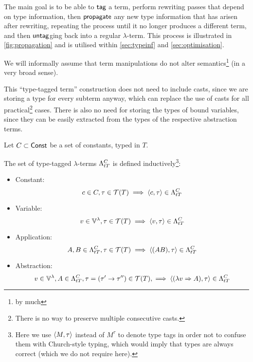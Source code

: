 \documentclass[main.tex]{subfiles}
\begin{document}
The main goal is to be able to $\mcf{tag}$ a term,
perform rewriting passes that depend on type information, then $\mcf{propagate}$
any new type information that has arisen after rewriting, repeating the
process until it no longer produces a different term, and then $\mcf{untag}$ging
back into a regular $\lambda$-term. This process is illustrated in
\cref{fig:propagation} and is utilised within \cref{sec:typeinf} and
\cref{sec:optimisation}.


We will informally assume that term manipulations do not alter semantics\footnote{
    by much} (in a very broad sense).

This ``type-tagged term'' construction  does not need to include casts, since we are storing
a type for every subterm anyway, which can replace the use of casts for all
practical\footnote{
    There is no way to preserve multiple consecutive casts.
} cases. There is also no need for storing the types of bound variables, since
they can be easily extracted from the types of the respective abstraction terms.
\begin{defn}
    Let $C \subset \const$ be a set of constants, typed in $T$.

    The set of type-tagged $\lambda$-terms $\ttlambda{T}{C}$ is defined inductively\footnote{
        Here we use $\ttt{ M}{ \tau }$ instead of $M^\tau$
        to denote type tags in order not to confuse them with Church-style
        typing, which would imply that types are always correct (which we
        do not require here).
    }:
    \begin{itemize}
        \item Constant:
            \[ c \in C, \tau \in \tclos{T} \implies \ttt{c}{\tau} \in \ttlambda{T}{C} \]
        \item Variable:
            \[ v \in \lvars, \tau \in \tclos{T} \implies \ttt{v}{\tau} \in \ttlambda{T}{C} \]
        \item Application:
            \[ A, B \in \ttlambda{T}{C}, \tau \in \tclos{T} \implies \ttt{(AB)}{\tau} \in \ttlambda{T}{C} \]
        \item Abstraction:
            \[ v \in \lvars, A \in \ttlambda{T}{C},
                \tau = (\tau' \tot \tau'') \in \tclos{T},
                \implies \ttt{(\lambda v \abstr A)}{\tau} \in \ttlambda{T}{C} \]
    \end{itemize}
\end{defn}
\end{document}
